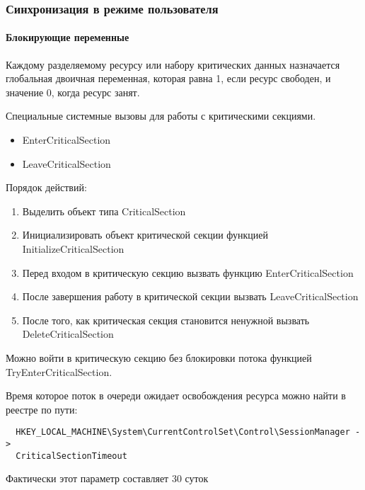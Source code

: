\subsubsection{Синхронизация в режиме пользователя}

\paragraph{Блокирующие переменные}\mbox{}\par
Каждому разделяемому ресурсу или набору критических данных назначается
глобальная двоичная переменная, которая равна 1, если ресурс свободен, и
значение 0, когда ресурс занят.

Специальные системные вызовы для работы с критическими секциями.
\begin{itemize}
  \item EnterCriticalSection
  \item LeaveCriticalSection
\end{itemize}

Порядок действий:
\begin{enumerate}
  \item Выделить объект типа CriticalSection
  \item Инициализировать объект критической секции функцией
    InitializeCriticalSection
  \item Перед входом в критическую секцию вызвать функцию EnterCriticalSection
  \item После завершения работу в критической секции вызвать
    LeaveCriticalSection
  \item После того, как критическая секция становится ненужной вызвать
    DeleteCriticalSection
\end{enumerate}

Можно войти в критическую секцию без блокировки потока функцией
TryEnterCriticalSection.

Время которое поток в очереди ожидает освобождения ресурса можно найти в реестре
по пути:
\begin{verbatim}
  HKEY_LOCAL_MACHINE\System\CurrentControlSet\Control\SessionManager ->
  CriticalSectionTimeout
\end{verbatim}
Фактически этот параметр составляет 30 суток
